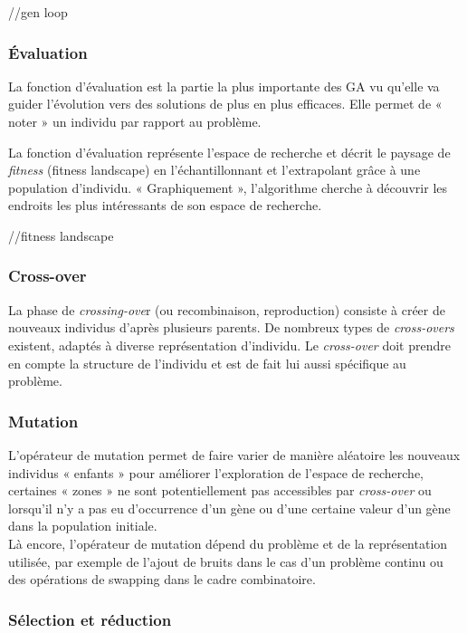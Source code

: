 \documentclass[french, 11pt]{memoir}
\begin{document}
//gen loop

\subsubsection{Évaluation}\label{uxe9valuation}

La fonction d'évaluation est la partie la plus importante des GA vu
qu'elle va guider l'évolution vers des solutions de plus en plus
efficaces. Elle permet de « noter » un individu par rapport au problème.

\bigskip
La fonction d'évaluation représente l'espace de recherche et décrit le
paysage de \emph{fitness} (fitness landscape) en l'échantillonnant et
l'extrapolant grâce à une population d'individu. « Graphiquement »,
l'algorithme cherche à découvrir les endroits les plus intéressants de
son espace de recherche.

//fitness landscape

\subsubsection{Cross-over}\label{cross-over}

La phase de \emph{crossing-ove}r (ou recombinaison, reproduction)
consiste à créer de nouveaux individus d'après plusieurs parents. De
nombreux types de \emph{cross-overs} existent, adaptés à diverse
représentation d'individu. Le \textit{cross-over} doit prendre en compte la
structure de l'individu et est de fait lui aussi spécifique au problème.

\subsubsection{Mutation}\label{mutation}

L'opérateur de mutation permet de faire varier de manière aléatoire les
nouveaux individus « enfants » pour améliorer l'exploration de l'espace
de recherche, certaines « zones » ne sont potentiellement pas
accessibles par \emph{cross-over} ou lorsqu'il n'y a pas eu d'occurrence
d'un gène ou d'une certaine valeur d'un gène dans la population
initiale.\\
 Là encore, l'opérateur de mutation dépend du problème et de la
représentation utilisée, par exemple de l'ajout de bruits dans le cas
d'un problème continu ou des opérations de swapping dans le cadre
combinatoire.

\subsubsection{Sélection et
	réduction}\label{suxe9lection-et-ruxe9duction}
\end{document}
